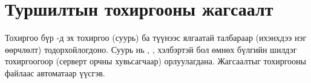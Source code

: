 
\chapter{Туршилтын тохиргооны жагсаалт}
\label{AppendixC}
\pagecolor{white}

Тохиргоо бүр -д эх тохиргоо (суурь) ба түүнээс ялгаатай талбараар (ихэнхдээ нэг өөрчлөлт) тодорхойлогдоно. Суурь нь
, ,  хэлбэртэй бол өмнөх бүлгийн шилдэг тохиргоогоор
(серверт  орчны хувьсагчаар) орлуулагдана. Жагсаалтыг  тохиргооны файлаас
автоматаар үүсгэв.


